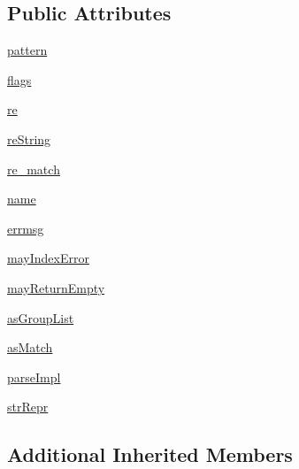 \subsection*{Public Attributes}
\begin{DoxyCompactItemize}
\item 
\hyperlink{classpyparsing_1_1Regex_abb03224d25c9d44c8f05196aa4b3ab59}{pattern}
\item 
\hyperlink{classpyparsing_1_1Regex_a1513664a667650fd7ab74ee9a06314e7}{flags}
\item 
\hyperlink{classpyparsing_1_1Regex_a9840d5f32edebdeb8a22dcc2aacac1bc}{re}
\item 
\hyperlink{classpyparsing_1_1Regex_a2f5782aac800630eefd875fa1acc6ebb}{re\+String}
\item 
\hyperlink{classpyparsing_1_1Regex_a7198487f3b3f6173fd8b638d6677fca8}{re\+\_\+match}
\item 
\hyperlink{classpyparsing_1_1Regex_a8882dfba9c86833d3035229dbbac54f4}{name}
\item 
\hyperlink{classpyparsing_1_1Regex_af2c86b78888a0803c99dc50348e2818c}{errmsg}
\item 
\hyperlink{classpyparsing_1_1Regex_a4f50d441aa4a1cdafe0292228b12fad3}{may\+Index\+Error}
\item 
\hyperlink{classpyparsing_1_1Regex_abec6f12e83ecc160a6bb235e625e8c88}{may\+Return\+Empty}
\item 
\hyperlink{classpyparsing_1_1Regex_a2aa294b82c85a3c8201aceaf9e88e98c}{as\+Group\+List}
\item 
\hyperlink{classpyparsing_1_1Regex_a5ac786a184a9f8a86abb05d98b7aabe8}{as\+Match}
\item 
\hyperlink{classpyparsing_1_1Regex_ac6ab18a329ead3bfb1217343cc6dcb72}{parse\+Impl}
\item 
\hyperlink{classpyparsing_1_1Regex_a253d2e6a456bb789ffcec48df6c43ff1}{str\+Repr}
\end{DoxyCompactItemize}
\subsection*{Additional Inherited Members}


